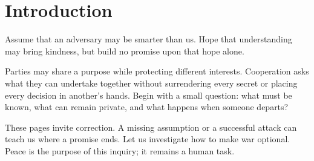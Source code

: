 \chapter{Introduction}
\label{short:introduction}

Assume that an adversary may be smarter than us. Hope that understanding may
bring kindness, but build no promise upon that hope alone.

Parties may share a purpose while protecting different interests. Cooperation
asks what they can undertake together without surrendering every secret or
placing every decision in another's hands. Begin with a small question: what
must be known, what can remain private, and what happens when someone departs?

These pages invite correction. A missing assumption or a successful attack
can teach us where a promise ends. Let us investigate how to make war
optional. Peace is the purpose of this inquiry; it remains a human task.

